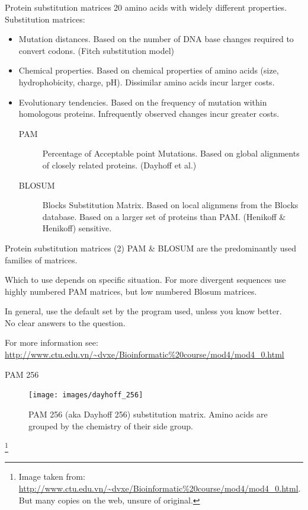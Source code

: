 \documentclass[pdf]{beamer}
\newcommand\blfootnote[1]{%
  \begingroup  %
  \renewcommand\thefootnote{}\footnote{#1}%
  \addtocounter{footnote}{-1}  %
  \endgroup
}
\begin{document}
\begin{frame}{Protein substitution matrices}
  20 amino acids with widely different properties.
  Substitution matrices:
  {\small
  \begin{itemize}
  \item Mutation distances. Based on the number of DNA base changes required to convert
    codons. (Fitch substitution model)
  \item Chemical properties. Based on chemical properties of amino acids
    (size, hydrophobicity, charge, pH). Dissimilar amino acids incur larger costs.
  \item Evolutionary tendencies. Based on the frequency of mutation within
    homologous proteins. Infrequently observed changes incur greater costs.
    \begin{description}
    \item[PAM] Percentage of Acceptable point Mutations. Based on global alignments of closely
      related proteins. (Dayhoff et al.)
    \item[BLOSUM] Blocks Substitution Matrix. Based on local alignmens from the
      Blocks database. Based on a larger set of proteins than PAM. (Henikoff \& Henikoff)
      sensitive.
    \end{description}
  \end{itemize}
  }
\end{frame}

\begin{frame}{Protein substitution matrices (2)}
  PAM \& BLOSUM are the predominantly used families of matrices.

  Which to use depends on specific situation. For more divergent sequences
  use highly numbered PAM matrices, but low numbered Blosum matrices.

  In general, use the default set by the program used, unless you know
  better.\\
  No clear answers to the question. 

  For more information see:\\
  \url{http://www.ctu.edu.vn/~dvxe/Bioinformatic\%20course/mod4/mod4_0.html}
  
\end{frame}

\begin{frame}{PAM 256}
  \begin{figure}[ht]
    \texttt{[image: images/dayhoff\_256]}
    \caption{  PAM 256 (aka Dayhoff 256) substitution matrix. Amino acids are
    grouped by the chemistry of their side group.}
  \end{figure}
  \blfootnote{Image taken from:
    \url{http://www.ctu.edu.vn/~dvxe/Bioinformatic\%20course/mod4/mod4_0.html}.\\
  But many copies on the web, unsure of original.}
\end{frame}
\end{document}
